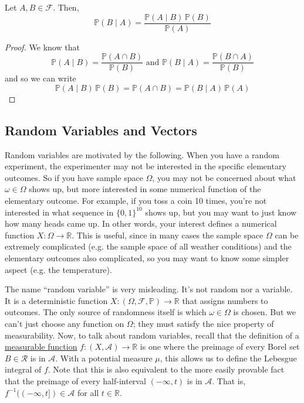   \begin{theorem}
    \label{thm:bayes-rule}
    Let $A, B \in \mathcal{F}$. Then, 
    \begin{equation}
      \mathbb{P}(B \mid A) = \frac{\mathbb{P}(A \mid B) \, \mathbb{P}(B)}{\mathbb{P}(A)}
    \end{equation}
  \end{theorem}
  \begin{proof}
    We know that 
    \begin{equation}
      \mathbb{P}(A \mid B) = \frac{\mathbb{P} (A \cap B)}{\mathbb{P}(B)} \text{ and } \mathbb{P}(B \mid A) = \frac{\mathbb{P}(B \cap A)}{\mathbb{P}(B)}
    \end{equation}
    and so we can write 
    \begin{equation}
      \mathbb{P} (A \mid B) \, \mathbb{P}(B) = \mathbb{P}(A \cap B) = \mathbb{P}(B \mid A) \, \mathbb{P}(A)
    \end{equation}
  \end{proof}

\subsection{Random Variables and Vectors} 

  Random variables are motivated by the following. When you have a random experiment, the experimenter may not be interested in the specific elementary outcomes. So if you have sample space $\Omega$, you may not be concerned about what $\omega \in \Omega$ shows up, but more interested in some numerical function of the elementary outcome. For example, if you toss a coin 10 times, you're not interested in what sequence in $\{0, 1\}^{10}$ shows up, but you may want to just know how many heads came up. In other words, your interest defines a numerical function $X: \Omega \rightarrow \mathbb{R}$. This is useful, since in many cases the sample space $\Omega$ can be extremely complicated (e.g. the sample space of all weather conditions) and the elementary outcomes also complicated, so you may want to know some simpler aspect (e.g. the temperature). 

  The name ``random variable'' is very misleading. It's not random nor a variable. It is a deterministic function $X: (\Omega, \mathcal{F}, \mathbb{P}) \to \mathbb{R}$ that assigns numbers to outcomes. The only source of randomness itself is which $\omega \in \Omega$ is chosen. But we can't just choose any function on $\Omega$; they must satisfy the nice property of measurability. Now, to talk about random variables, recall that the definition of a \hyperref[mt-def:measurable-function]{measurable function} $f: (X, \mathcal{A}) \to \mathbb{R}$ is one where the preimage of every Borel set $B \in \mathcal{R}$ is in $\mathcal{A}$. With a potential measure $\mu$, this allows us to define the Lebesgue integral of $f$. Note that this is also equivalent to the more easily provable fact that the preimage of every half-interval $(-\infty, t)$ is in $\mathcal{A}$. That is, $f^{-1}((-\infty, t]) \in \mathcal{A}$ for all $t \in \mathbb{R}$. 

